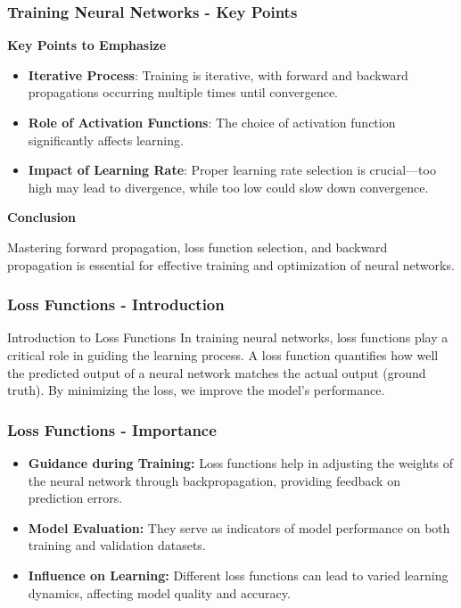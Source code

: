 \documentclass[aspectratio=169]{beamer}
\begin{document}
\begin{frame}[fragile]
  \frametitle{Training Neural Networks - Key Points}
  \textbf{Key Points to Emphasize}
  
  \begin{itemize}
    \item \textbf{Iterative Process}: Training is iterative, with forward and backward propagations occurring multiple times until convergence.
    \item \textbf{Role of Activation Functions}: The choice of activation function significantly affects learning.
    \item \textbf{Impact of Learning Rate}: Proper learning rate selection is crucial—too high may lead to divergence, while too low could slow down convergence.
  \end{itemize}
  
  \textbf{Conclusion}
  
  Mastering forward propagation, loss function selection, and backward propagation is essential for effective training and optimization of neural networks.
\end{frame}

\begin{frame}[fragile]
  \frametitle{Loss Functions - Introduction}
  \begin{block}{Introduction to Loss Functions}
    In training neural networks, loss functions play a critical role in guiding the learning process. A loss function quantifies how well the predicted output of a neural network matches the actual output (ground truth). By minimizing the loss, we improve the model's performance.
  \end{block}
\end{frame}

\begin{frame}[fragile]
  \frametitle{Loss Functions - Importance}
  \begin{itemize}
    \item \textbf{Guidance during Training:} Loss functions help in adjusting the weights of the neural network through backpropagation, providing feedback on prediction errors.
    \item \textbf{Model Evaluation:} They serve as indicators of model performance on both training and validation datasets.
    \item \textbf{Influence on Learning:} Different loss functions can lead to varied learning dynamics, affecting model quality and accuracy.
  \end{itemize}
\end{frame}
\end{document}
